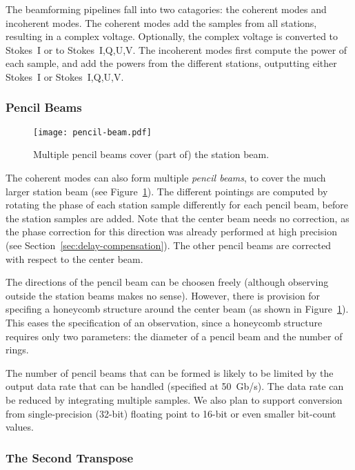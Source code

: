 The beamforming pipelines fall into two catagories: the coherent modes and
incoherent modes.
The coherent modes add the samples from all stations, resulting in a
complex voltage.
Optionally, the complex voltage is converted to Stokes~I or to Stokes~I,Q,U,V.
The incoherent modes first compute the power of each sample, and add the
powers from the different stations, outputting either Stokes~I or
Stokes~I,Q,U,V.


\subsubsection{Pencil Beams}

\begin{figure}
\begin{center}
\texttt{[image: pencil-beam.pdf]}
\end{center}
\caption{Multiple pencil beams cover (part of) the station beam.}
\label{fig:pencil-beams}
\end{figure}

The coherent modes can also form multiple \emph{pencil beams}, to cover the
much larger station beam (see Figure~\ref{fig:pencil-beams}).
The different pointings are computed by rotating the phase of each station
sample differently for each pencil beam, before the station samples are added.
Note that the center beam needs no correction, as the phase correction for
this direction was already performed at high precision (see
Section~\ref{sec:delay-compensation}).
The other pencil beams are corrected with respect to the center beam.

The directions of the pencil beam can be choosen freely (although observing
outside the station beams makes no sense).
However, there is provision for specifing a honeycomb structure around the
center beam (as shown in Figure~\ref{fig:pencil-beams}).
This eases the specification of an observation, since a honeycomb structure
requires only two parameters: the diameter of a pencil beam and the number
of rings.

The number of pencil beams that can be formed is likely to be limited by the
output data rate that can be handled (specified at 50~Gb/s).
The data rate can be reduced by integrating multiple samples.
We also plan to support conversion from single-precision (32-bit) floating
point to 16-bit or even smaller bit-count values.


\subsubsection{The Second Transpose}

